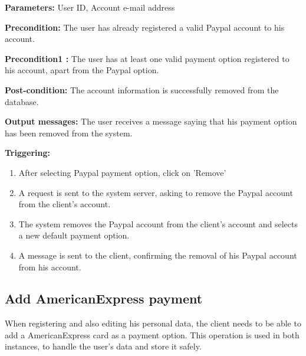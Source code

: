 \begin{description}

\item \textbf{Parameters:} User ID, Account e-mail address

\item \textbf{Precondition:} The user has already registered a valid
Paypal account to his account.
\item \textbf{Precondition1 :} The user has at least one valid payment option
registered to his account, apart from the Paypal option.

\item \textbf{Post-condition:} The account information is successfully removed
from the database.

\item \textbf{Output messages:} The user receives a message saying that his
payment option has been removed from the system.

\item \textbf{Triggering:}
\begin{enumerate}
\item After selecting Paypal payment option, click on 'Remove'

\item A request is sent to the system server, asking to remove the Paypal account
from the client's account.

\item The system removes the Paypal account from the client's account and selects a
new default payment option.

\item A message is sent to the client, confirming the removal of his Paypal account from his account.

\end{enumerate}

\end{description}

\subsection{Add AmericanExpress payment}

 When registering and also editing his personal data, the client needs to be
 able to add a AmericanExpress card as a payment option. This operation is used
 in both instances, to handle the user's data and store it safely.

